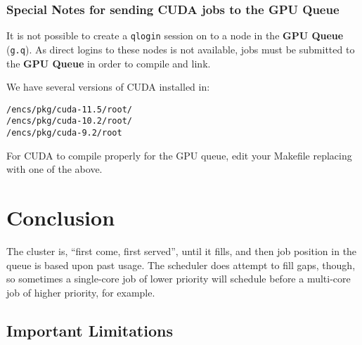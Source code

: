 \documentclass{easychair}
\begin{document}
\subsubsection{Special Notes for sending CUDA jobs to the GPU Queue}

It is not possible to create a \texttt{qlogin} session on to a node in the 
\textbf{GPU Queue} (\texttt{g.q}). As direct logins to these nodes is not 
available, jobs must be submitted to the \textbf{GPU Queue} in order to compile 
and link.

We have several versions of CUDA installed in:
\begin{verbatim}
/encs/pkg/cuda-11.5/root/
/encs/pkg/cuda-10.2/root/
/encs/pkg/cuda-9.2/root
\end{verbatim}

For CUDA to compile properly for the GPU queue, edit your Makefile 
replacing  with one of the above.


\section{Conclusion}
\label{sect:conclusion}

The cluster is, ``first come, first served'', until it fills, and then job
position in the queue is based upon past usage. The scheduler does attempt
to fill gaps, though, so sometimes a single-core job of lower priority
will schedule before a multi-core job of higher priority, for example.

\subsection{Important Limitations}
\label{sect:limitations}
\end{document}
